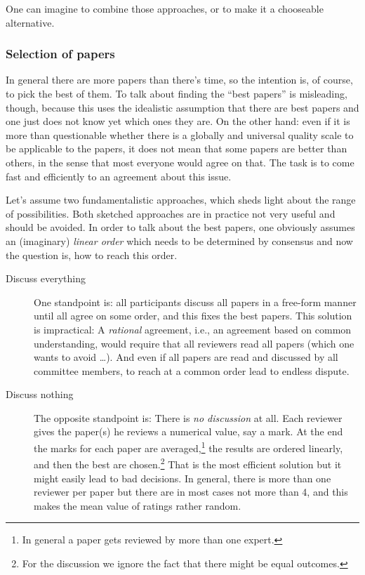 One can imagine to combine those approaches, or to make it a chooseable
alternative.

\subsubsection{Selection of  papers}
\label{sec:bestpapers}%

In general there are more papers than there's time, so the intention is, of
course, to pick the best of them.  To talk about finding the ``best
papers'' is misleading, though, because this uses the idealistic assumption
that there are best papers and one just does not know yet which ones they
are. On the other hand: even if it is more than questionable whether there
is a globally and universal quality scale to be applicable to the papers,
it does not mean that some papers are better than others, in the sense that
most everyone would agree on that. The task is to come fast and efficiently
to an agreement about this issue.

\medskip


Let's assume two fundamentalistic approaches, which sheds light about the
range of possibilities. Both sketched approaches are in practice not very
useful and should be avoided.  In order to talk about the best papers, one
obviously assumes an (imaginary) \emph{linear order} which needs to be
determined by consensus and now the question is, how to reach this order.

\begin{description}
\item[Discuss everything] One standpoint is: all participants discuss all
  papers in a free-form manner until all agree on some order, and this
  fixes the best papers. This solution is impractical: A \emph{rational}
  agreement, i.e., an agreement based on common understanding, would
  require that all reviewers read all papers (which one wants to avoid
  \ldots). And even if all papers are read and discussed by all committee
  members, to reach at a common order lead to endless dispute.
\item[Discuss nothing] The opposite standpoint is: There is \emph{no
    discussion} at all. Each reviewer gives the paper(s) he reviews a
  numerical value, say a mark. At the end the marks for each paper are
  averaged,\footnote{In general a paper gets reviewed by more than one
    expert.} the results are ordered linearly, and then the best are
  chosen.\footnote{For the discussion we ignore the fact that there might
    be equal outcomes.} That is the most efficient solution but it might
  easily lead to bad decisions. In general, there is more than one reviewer
  per paper but there are in most cases not more than 4, and this makes the
  mean value of ratings rather random.
\end{description}

